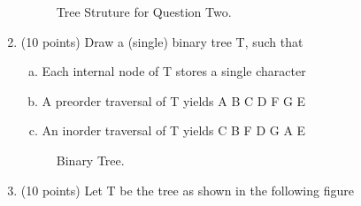 \documentclass{article}
\begin{document}
\begin{enumerate}
\begin{figure}[H]
  \vspace{-10pt}
  \begin{center}
    \caption{Tree Struture for Question Two.\label{fig:question2}}
    \vspace{-10pt}
  \end{center}
\end{figure}

\item(10 points) Draw a (single) binary tree T, such that
\begin{enumerate}[(a)]
\item Each internal node of T stores a single character
\item A preorder traversal of T yields A B C D F G E
\item An inorder traversal of T yields C B F D G A E 
\hspace{1em}
\end{enumerate}
\begin{figure}[H]
  \vspace{-10pt}
  \begin{center}
    \caption{Binary Tree.\label{fig:question3}}
    \vspace{-15pt}
  \end{center}
\end{figure}

\item(10 points) Let T be the tree as shown in the following figure


\end{enumerate}
\end{document}
